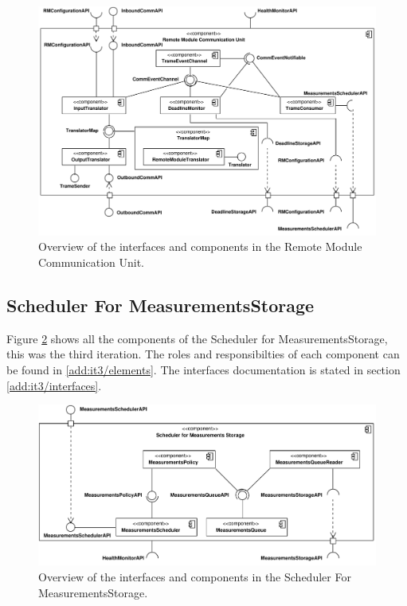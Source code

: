 \begin{figure}
	\begin{centering}
		\includegraphics[width=\textwidth]{figs/add-it2-interfaces.pdf}
		\caption{Overview of the interfaces and components in the Remote
		Module Communication Unit.}
		\label{fig:final-architecture/it2}
	\end{centering}
\end{figure}

\subsection{Scheduler For MeasurementsStorage}

\npar Figure \ref{fig:final-architecture/it3} shows all the components of the
Scheduler for MeasurementsStorage, this was the third iteration. The roles and
responsibilties of each component can be found in \ref{add:it3/elements}. The
interfaces documentation is stated in section \ref{add:it3/interfaces}.

\begin{figure}
	\begin{centering}
		\includegraphics[width=\textwidth]{figs/add-it3-interfaces.pdf}
		\caption{Overview of the interfaces and components in the Scheduler For
		MeasurementsStorage.}
		\label{fig:final-architecture/it3}
	\end{centering}
\end{figure}


